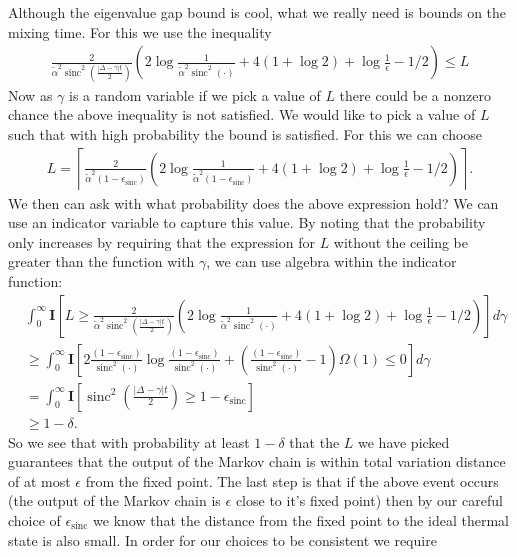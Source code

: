 \documentclass{article}
\DeclareMathOperator{\sinc}{sinc}
\begin{document}
Although the eigenvalue gap bound is cool, what we really need is bounds on the mixing time. For this we use the inequality
\begin{align}
    \frac{2}{\widetilde{\alpha}^2 \sinc^2 \left( \frac{|\Delta - \gamma|t}{2} \right)} \left( 2 \log \frac{1}{\widetilde{\alpha}^2 \sinc^2( \cdot )} + 4(1 + \log 2) +  \log \frac{1}{\epsilon} - 1/2 \right) \le L
\end{align}
Now as $\gamma$ is a random variable if we pick a value of $L$ there could be a nonzero chance the above inequality is not satisfied. We would like to pick a value of $L$ such that with high probability the bound is satisfied. For this we can choose 
\begin{align}
    L = \left\lceil \frac{2}{\widetilde{\alpha}^2 (1 - \epsilon_{\sinc})} \left( 2 \log \frac{1}{\widetilde{\alpha}^2 (1 - \epsilon_{\sinc})} + 4(1 + \log 2) +  \log \frac{1}{\epsilon} - 1/2 \right) \right\rceil.
\end{align}
We then can ask with what probability does the above expression hold? We can use an indicator variable to capture this value. By noting that the probability only increases by requiring that the expression for $L$ without the ceiling be greater than the function with $\gamma$, we can use algebra within the indicator function:
\begin{align}
    &\int_0^\infty \mathbf{I} \left[ L \ge \frac{2}{\widetilde{\alpha}^2 \sinc^2 \left( \frac{|\Delta - \gamma|t}{2} \right)} \left( 2 \log \frac{1}{\widetilde{\alpha}^2 \sinc^2( \cdot )} + 4(1 + \log 2) +  \log \frac{1}{\epsilon} - 1/2 \right) \right] d\gamma \\
    &\ge \int_0^\infty \mathbf{I} \left[ 2\frac{(1 - \epsilon_{\sinc})}{\sinc^2(\cdot)} \log \frac{(1 - \epsilon_{\sinc})}{\sinc^2(\cdot)} + \left(\frac{(1 - \epsilon_{\sinc})}{\sinc^2(\cdot)} - 1\right) \Omega(1) \le 0 \right] d\gamma \\
    &= \int_0^\infty \mathbf{I} \left[ \sinc^2\left( \frac{|\Delta - \gamma| t}{2} \right) \geq 1 - \epsilon_{\sinc} \right] \\
    &\ge 1 - \delta.
\end{align}
So we see that with probability at least $1 - \delta$ that the $L$ we have picked guarantees that the output of the Markov chain is within total variation distance of at most $\epsilon$ from the fixed point. The last step is that if the above event occurs (the output of the Markov chain is $\epsilon$ close to it's fixed point) then by our careful choice of $\epsilon_{\sinc}$ we know that the distance from the fixed point to the ideal thermal state is also small. In order for our choices to be consistent we require 
\end{document}
